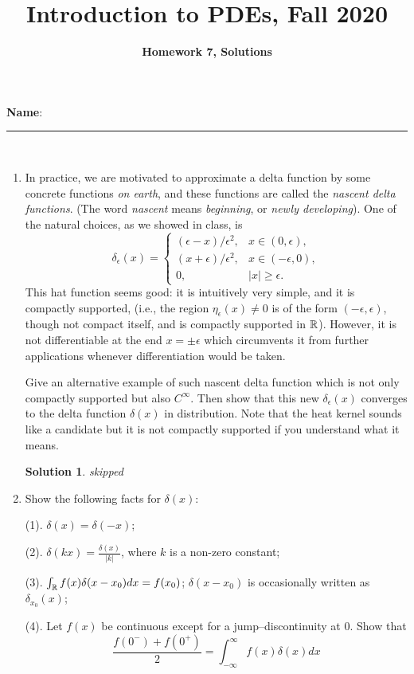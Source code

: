 \documentclass[6pt]{article}
\title{Introduction to PDEs, Fall 2020}
\author{\textbf{Homework 7, Solutions}}
\date{}
\newtheorem{solution}{Solution}
\numberwithin{equation}{section}
\def\mathbb{\Bbb}
\begin{document}
\maketitle

\textbf{Name}:\rule{1 in}{0.001 in} \\
\begin{enumerate}
\item In practice, we are motivated to approximate a delta function by some concrete functions \emph{on earth}, and these functions are called the \emph{nascent delta functions}.  (The word \emph{nascent} means \emph{beginning}, or \emph{newly developing}).  One of the natural choices, as we showed in class, is
  \begin{equation}
\delta_\epsilon(x)=\left\{
\begin{array}{ll}
(\epsilon-x)/\epsilon^2,&x\in(0,\epsilon),\\
(x+\epsilon)/\epsilon^2,&x\in(-\epsilon,0),\\
0,&\vert x \vert \geq \epsilon.
\end{array}
\right.
\end{equation}
This hat function seems good: it is intuitively very simple, and it is compactly supported, (i.e., the region $\eta_\epsilon(x)\neq0$ is of the form $(-\epsilon,\epsilon)$, though not compact itself, and is compactly supported in $\mathbb R$).  However, it is not differentiable at the end $x=\pm\epsilon$ which circumvents it from further applications whenever differentiation would be taken.

Give an alternative example of such nascent delta function which is not only compactly supported but also $C^\infty$.  Then show that this new $\delta_\epsilon(x)$ converges to the delta function $\delta(x)$ in distribution.  Note that the heat kernel sounds like a candidate but it is not compactly supported if you understand what it means.
\begin{solution}
skipped
\end{solution}

\item  Show the following facts for $\delta(x)$:

(1).  $\delta(x)=\delta(-x)$;

(2). $\delta(kx)=\frac{\delta(x)}{\vert k\vert }$, where $k$ is a non-zero constant;

(3).  $\int_\mathbb{R} f(x)\delta(x-x_0) dx=f(x_0)$; $\delta(x-x_0)$ is occasionally written as $\delta_{x_0}(x)$;

(4).  Let $f(x)$ be continuous except for a jump--discontinuity at $0$.  Show that
\[\frac{f(0^-)+f(0^+)}{2}=\int_{-\infty}^\infty f(x)\delta(x)dx\]


\end{enumerate}
\end{document}
